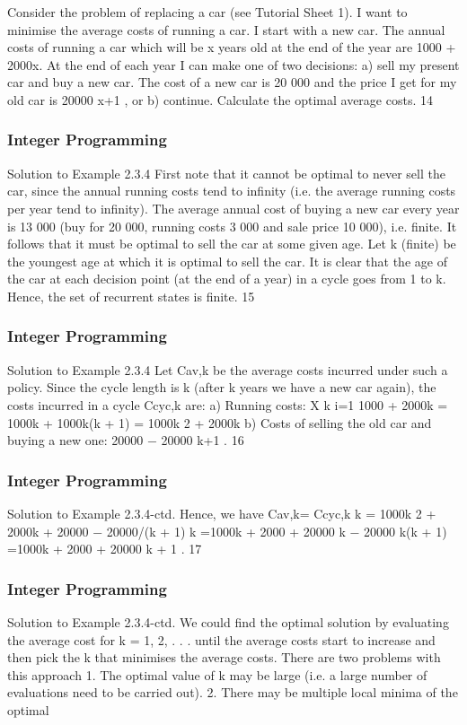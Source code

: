 \begin{frame}
Consider the problem of replacing a car (see Tutorial Sheet 1).
I want to minimise the average costs of running a car. I start with
a new car.
The annual costs of running a car which will be x years old at the
end of the year are 1000 + 2000x.
At the end of each year I can make one of two decisions: a) sell my
present car and buy a new car. The cost of a new car is 20 000
and the price I get for my old car is 20000
x+1 , or b) continue.
Calculate the optimal average costs.
14 \end{frame}  \begin{frame} \frametitle{Integer Programming}     
Solution to Example 2.3.4
First note that it cannot be optimal to never sell the car, since the
annual running costs tend to infinity (i.e. the average running
costs per year tend to infinity).
The average annual cost of buying a new car every year is 13 000
(buy for 20 000, running costs 3 000 and sale price 10 000), i.e.
finite.
It follows that it must be optimal to sell the car at some given age.
Let k (finite) be the youngest age at which it is optimal to sell the
car. It is clear that the age of the car at each decision point (at
the end of a year) in a cycle goes from 1 to k. Hence, the set of
recurrent states is finite.
15 \end{frame}  \begin{frame} \frametitle{Integer Programming}     
Solution to Example 2.3.4
Let Cav,k be the average costs incurred under such a policy.
Since the cycle length is k (after k years we have a new car again),
the costs incurred in a cycle Ccyc,k are:
a) Running costs:
X
k
i=1
1000 + 2000k = 1000k + 1000k(k + 1) = 1000k
2 + 2000k
b) Costs of selling the old car and buying a new one:
20000 −
20000
k+1 .
16 \end{frame}  \begin{frame} \frametitle{Integer Programming}     
Solution to Example 2.3.4-ctd.
Hence, we have
Cav,k=
Ccyc,k
k
=
1000k
2 + 2000k + 20000 − 20000/(k + 1)
k
=1000k + 2000 + 20000
k
−
20000
k(k + 1)
=1000k + 2000 + 20000
k + 1
.
17 \end{frame}  \begin{frame} \frametitle{Integer Programming}     
Solution to Example 2.3.4-ctd.
We could find the optimal solution by evaluating the average cost
for k = 1, 2, . . . until the average costs start to increase and then
pick the k that minimises the average costs.
There are two problems with this approach
1. The optimal value of k may be large (i.e. a large
number of evaluations need to be carried out).
2. There may be multiple local minima of the optimal

\end{frame}
